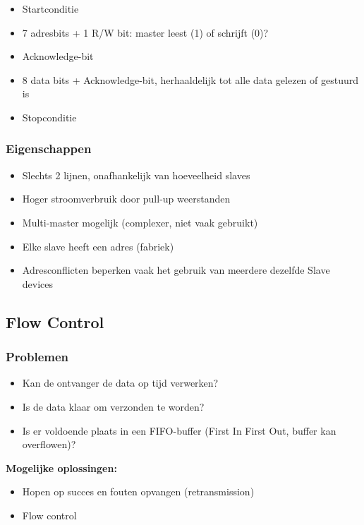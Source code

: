 \documentclass{article}
\newcommand{\bold}[1]{\textbf{#1}}
\begin{document}
\begin{itemize}
    \item Startconditie
    \item 7 adresbits + 1 R/W bit: master leest (1) of schrijft (0)?
    \item Acknowledge-bit
    \item 8 data bits + Acknowledge-bit, herhaaldelijk tot alle data gelezen of gestuurd is
    \item Stopconditie
\end{itemize}

\subsubsection{Eigenschappen}

\begin{itemize}
    \item Slechts 2 lijnen, onafhankelijk van hoeveelheid slaves
    \item Hoger stroomverbruik door pull-up weerstanden
    \item Multi-master mogelijk (complexer, niet vaak gebruikt)
    \item Elke slave heeft een adres (fabriek)
    \item Adresconflicten beperken vaak het gebruik van meerdere dezelfde Slave devices
\end{itemize}

\subsection{Flow Control}
\subsubsection{Problemen}
\begin{itemize}
    \item Kan de ontvanger de data op tijd verwerken?
    \item Is de data klaar om verzonden te worden?
    \item Is er voldoende plaats in een FIFO-buffer (First In First Out, buffer kan overflowen)?
\end{itemize}

\bold{Mogelijke oplossingen:}
\begin{itemize}
    \item Hopen op succes en fouten opvangen (retransmission)
    \item Flow control
\end{itemize}
\end{document}
